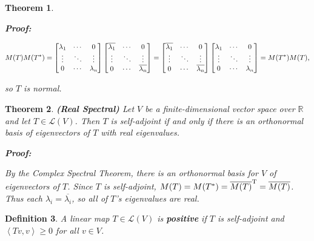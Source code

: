 \documentclass{article}
\theoremstyle{colontheorem}
\newtheorem{theorem}{Theorem}[section]
\newtheorem{definition}[theorem]{Definition}
\newenvironment{Theorem}
{
	\begin{mdframed}[backgroundcolor=TheoremOrange!10]
	\begin{theorem}
}
{
	\end{theorem}
	\end{mdframed}
	
	\vspace{.15in}
}
\newenvironment{Def}
{
	\begin{mdframed}[backgroundcolor=DefGreen!10]
	\begin{definition}
}
{
	\end{definition}
	\end{mdframed}
	
	\vspace{.15in}
}
\newenvironment{Proof}
{
	\begin{mdframed}[backgroundcolor=ProofPurple!10]
	\textbf{Proof:}%
}
{
	\end{mdframed}
	
	\vspace{.085in}
}
\begin{document}
\begin{Theorem}
\begin{Proof}
		$$
			M(T)M(T^*) = \begin{bmatrix}
				\lambda_1 & \cdots & 0\\
				\vdots & \ddots & \vdots\\
				0 & \cdots & \lambda_n
			\end{bmatrix} \begin{bmatrix}	
				\overline{\lambda_1} & \cdots & 0\\
				\vdots & \ddots & \vdots\\
				0 & \cdots & \overline{\lambda_n} 
			\end{bmatrix} = \begin{bmatrix}
				\overline{\lambda_1} & \cdots & 0\\
				\vdots & \ddots & \vdots\\
				0 & \cdots & \overline{\lambda_n} 
			\end{bmatrix} \begin{bmatrix}
				\lambda_1 & \cdots & 0\\
				\vdots & \ddots & \vdots\\
				0 & \cdots & \lambda_n
			\end{bmatrix} = M(T^*) M(T) \textnormal{,}
		$$
		
		so $T$ is normal.
		
	\end{Proof}
	
\end{Theorem}



\begin{Theorem}
	
	\textbf{(Real Spectral)} Let $V$ be a finite-dimensional vector space over $\mathbb{R}$ and let $T \in \mathcal{L}(V)$. Then $T$ is self-adjoint if and only if there is an orthonormal basis of eigenvectors of $T$ with real eigenvalues.
	
	\begin{Proof}
		By the Complex Spectral Theorem, there is an orthonormal basis for $V$ of eigenvectors of $T$. Since $T$ is self-adjoint, $M(T) = M(T^*) = \overline{M(T)}^\textnormal{T} = \overline{M(T)}$. Thus each $\lambda_i = \overline{\lambda_i}$, so all of $T$'s eigenvalues are real.
		
	\end{Proof}

\end{Theorem}



\begin{Def}
	
	A linear map $T \in \mathcal{L}(V)$ is \textbf{positive} if $T$ is self-adjoint and $\left< Tv, v \right> \geq 0$ for all $v \in V$.
	
\end{Def}
\end{document}
